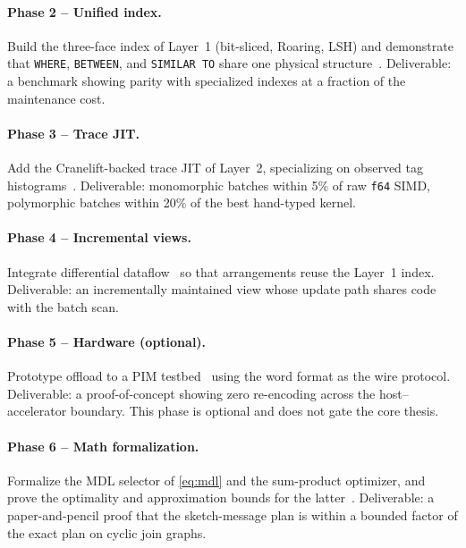 \documentclass[10pt]{article}
\begin{document}
\paragraph{Phase 2 -- Unified index.}
Build the three-face index of Layer~1 (bit-sliced, Roaring, LSH) and
demonstrate that \texttt{WHERE}, \texttt{BETWEEN}, and \texttt{SIMILAR
TO} share one physical
structure~\citep{oneil1997improved,chan1998bitmap,chambi2016roaring,andoni2008near}.
Deliverable: a benchmark showing parity with specialized indexes at a
fraction of the maintenance cost.

\paragraph{Phase 3 -- Trace JIT.}
Add the Cranelift-backed trace JIT of Layer~2, specializing on observed
tag histograms~\citep{gal2009trace,polychroniou2015arithmetic}.
Deliverable: monomorphic batches within 5\% of raw \texttt{f64} SIMD,
polymorphic batches within 20\% of the best hand-typed kernel.

\paragraph{Phase 4 -- Incremental views.}
Integrate differential dataflow~\citep{mcsherry2013differential,budiu2023dbsp}
so that arrangements reuse the Layer~1 index. Deliverable: an
incrementally maintained view whose update path shares code with the
batch scan.

\paragraph{Phase 5 -- Hardware (optional).}
Prototype offload to a PIM testbed~\citep{gomez2023benchmarking,li2017drisa,seshadri2017fulcrum}
using the word format as the wire protocol. Deliverable: a
proof-of-concept showing zero re-encoding across the host--accelerator
boundary. This phase is optional and does not gate the core thesis.

\paragraph{Phase 6 -- Math formalization.}
Formalize the MDL selector of \cref{eq:mdl} and the sum-product
optimizer, and prove the optimality and approximation bounds for the
latter~\citep{grunwald2004mdl,kschischang2001factor}. Deliverable: a
paper-and-pencil proof that the sketch-message plan is within a bounded
factor of the exact plan on cyclic join graphs.
\end{document}
